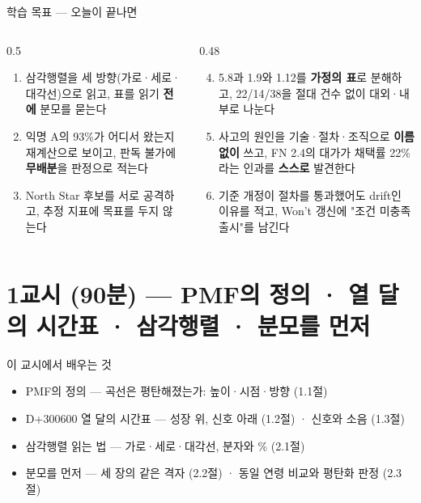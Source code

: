 \begin{frame}{학습 목표 — 오늘이 끝나면}
\begin{columns}[T]
\begin{column}{0.5\textwidth}
\begin{enumerate}
\item 삼각행렬을 세 방향(가로·세로·대각선)으로 읽고, 표를 읽기 \textbf{전에} 분모를 묻는다
\item 익명 A의 93\%가 어디서 왔는지 재계산으로 보이고, 판독 불가에 \textbf{무배분}을 판정으로 적는다
\item North Star 후보를 서로 공격하고, 추정 지표에 목표를 두지 않는다
\end{enumerate}
\end{column}
\begin{column}{0.48\textwidth}
\begin{enumerate}\setcounter{enumi}{3}
\item 5.8과 1.9와 1.12를 \textbf{가정의 표}로 분해하고, 22/14/38을 절대 건수 없이 대외·내부로 나눈다
\item 사고의 원인을 기술·절차·조직으로 \textbf{이름 없이} 쓰고, FN 2.4의 대가가 채택률 22\%라는 인과를 \textbf{스스로} 발견한다
\item 기준 개정이 절차를 통과했어도 drift인 이유를 적고, Won't 갱신에 "조건 미충족 출시"를 남긴다
\end{enumerate}
\end{column}
\end{columns}
\end{frame}

\section{1교시 (90분) — PMF의 정의 · 열 달의 시간표 · 삼각행렬 · 분모를 먼저}
\begin{frame}{이 교시에서 배우는 것}
\begin{itemize}
\item PMF의 정의 — 곡선은 평탄해졌는가: 높이·시점·방향 (1.1절)
\item D+300\til{}600 열 달의 시간표 — 성장 위, 신호 아래 (1.2절) · 신호와 소음 (1.3절)
\item 삼각행렬 읽는 법 — 가로·세로·대각선, 분자와 \% (2.1절)
\item 분모를 먼저 — 세 장의 같은 격자 (2.2절) · 동일 연령 비교와 평탄화 판정 (2.3절)
\end{itemize}
\end{frame}

